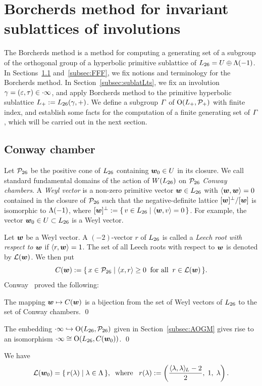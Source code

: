 \documentclass{amsart} %
\begin{document}
\section{Borcherds method for invariant sublattices of involutions}\label{sec:Borcherds}
%
The Borcherds method is a method for computing a generating set of 
a subgroup of the orthogonal group
of a hyperbolic primitive sublattice of $L_{26}=U\oplus \Lambda(-1)$.
In Sections~\ref{subsec:ConwayChamber} and~\ref{subsec:FFF},
we fix notions and terminology for the Borcherds method.
In Section~\ref{subsec:sublatLts}, 
we fix an involution
$\gamma=(\varepsilon, \tau)\in \cdot \infty$, and 
apply Borcherds method to the primitive hyperbolic sublattice
$L_{+}:=L_{26}(\gamma, +)$.
We define a subgroup $\varGamma$ of $ \mathord{\mathrm{O}}(L_{+}, \mathord{\mathcal{P}}_{+})$
with finite index, and establish some facts
for the computation of a finite generating set of
 $\varGamma$, which will be carried out in the next section.
%
%
\subsection{Conway chamber}\label{subsec:ConwayChamber}
%
Let $\mathord{\mathcal{P}}_{26}$ be the 
positive cone of $L_{26}$ 
containing $\boldsymbol{w}_0\in U$ in its closure.
We call standard fundamental domains of the action of $W(L_{26})$ on $\mathord{\mathcal{P}}_{26}$ 
\emph{Conway chambers}.
A \emph{Weyl vector} is a non-zero primitive vector $\boldsymbol{w} \in L_{26}$
with $\langle \boldsymbol{w} , \boldsymbol{w}  \rangle=0$ contained in 
the closure of $\mathord{\mathcal{P}}_{26}$ such that
the negative-definite lattice $[\boldsymbol{w} ]^{\perp}/[\boldsymbol{w} ]$ is isomorphic to $\Lambda(-1)$,
where $[\boldsymbol{w} ]^{\perp}:=\{\,{v\in L_{26}}\mid {\langle \boldsymbol{w}, v \rangle=0} \,\}$.
For example, 
the vector $\boldsymbol{w}_0\in U\subset L_{26}$ is a Weyl vector.
\par
Let $\boldsymbol{w} $ be a Weyl vector.
A $(-2)$-vector $r$ of $L_{26}$ is called a \emph{Leech root with respect to $\boldsymbol{w} $} if $\langle r, \boldsymbol{w}  \rangle=1$.
The set of all Leech roots with respect to $\boldsymbol{w} $ is denoted by $\mathord{\mathcal{L}}(\boldsymbol{w} )$.
We then put
\[
\mathord{C}(\boldsymbol{w} ):=\{\,{x\in\mathord{\mathcal{P}}_{26}}\mid {\langle x, r \rangle\ge 0\;\;\textrm{for all}\;\; r\in \mathord{\mathcal{L}}(\boldsymbol{w})} \,\}.
\]
%
Conway~\cite{MR690711} proved the following:
%
\begin{theorem}
The mapping $\boldsymbol{w} \mapsto \mathord{C}(\boldsymbol{w})$ is a bijection from the set of Weyl vectors of $L_{26}$ to
the set of Conway chambers.
\qed
\end{theorem}
%
\begin{corollary}
The embedding $\cdot \infty\hookrightarrow \mathord{\mathrm{O}}(L_{26}, \mathord{\mathcal{P}}_{26})$ given in Section~\ref{subsec:AOGM} 
gives rise to an isomorphism 
$\cdot \infty\cong \mathord{\mathrm{O}}(L_{26}, \mathord{C}(\boldsymbol{w}_0))$.
\qed
\end{corollary}
%
%
We have 
\begin{equation}\label{eq:Leechrootlambda}
\mathord{\mathcal{L}}(\boldsymbol{w}_0)=\{\,{r(\lambda)}\mid {\lambda\in \Lambda} \,\},
\;\;\textrm{where}\;\;\; r(\lambda):=\left(\frac{\langle \lambda, \lambda \rangle_{\hskip -1pt L}-2}{2}, \; 1,\; \lambda\right).
\end{equation}
%
%
%
%
\end{document}
